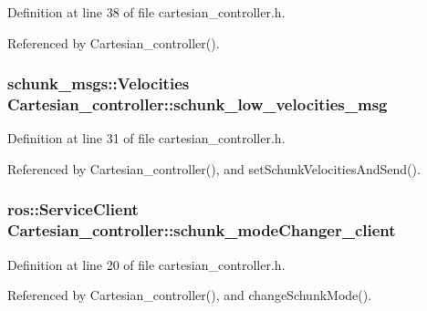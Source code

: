 Definition at line 38 of file cartesian\-\_\-controller.\-h.



Referenced by Cartesian\-\_\-controller().

\hypertarget{classCartesian__controller_af59178c57bdd73d9eb474577247bbe40}{
\subsubsection[{schunk\-\_\-low\-\_\-velocities\-\_\-msg}]{\setlength{\rightskip}{0pt plus 5cm}schunk\-\_\-msgs\-::\-Velocities Cartesian\-\_\-controller\-::schunk\-\_\-low\-\_\-velocities\-\_\-msg\hspace{0.3cm}{\ttfamily [protected]}}}\label{classCartesian__controller_af59178c57bdd73d9eb474577247bbe40}


Definition at line 31 of file cartesian\-\_\-controller.\-h.



Referenced by Cartesian\-\_\-controller(), and set\-Schunk\-Velocities\-And\-Send().

\hypertarget{classCartesian__controller_aee1fc445b64c534847ff0012132a5d2c}{
\subsubsection[{schunk\-\_\-mode\-Changer\-\_\-client}]{\setlength{\rightskip}{0pt plus 5cm}ros\-::\-Service\-Client Cartesian\-\_\-controller\-::schunk\-\_\-mode\-Changer\-\_\-client\hspace{0.3cm}{\ttfamily [protected]}}}\label{classCartesian__controller_aee1fc445b64c534847ff0012132a5d2c}


Definition at line 20 of file cartesian\-\_\-controller.\-h.



Referenced by Cartesian\-\_\-controller(), and change\-Schunk\-Mode().

